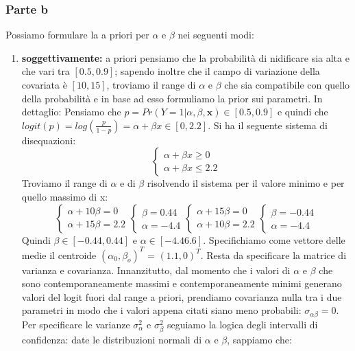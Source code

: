 \subsubsection*{Parte b} %
Possiamo formulare la a priori per $\alpha$ e $\beta$ nei seguenti modi:
\begin{enumerate}
  \item \textbf{soggettivamente:} a priori pensiamo che la probabilità di nidificare sia alta e che vari tra $[0.5, 0.9]$; sapendo inoltre che il campo di variazione della covariata è $[10, 15]$, troviamo il range di $\alpha$ e $\beta$ che sia compatibile con quello della probabilità e in base ad esso formuliamo la prior sui parametri. In dettaglio: Pensiamo che $p=Pr(Y=1 | \alpha, \beta, \mathbf{x}) \in [0.5, 0.9]$ e quindi che $logit(p) = log\left(\frac{p}{1-p}\right) = \alpha + \beta x \in [0, 2.2]$. Si ha il seguente sistema di disequazioni:
  $$\begin{cases} \alpha+\beta x \geq 0 \\ \alpha + \beta x \leq 2.2 \end{cases}$$
  Troviamo il range di $\alpha$ e di $\beta$ risolvendo il sistema per il valore minimo e per quello massimo di x:
  $$\begin{cases} \alpha+10\beta = 0 \\ \alpha +  15\beta = 2.2 \end{cases} \begin{cases}\beta = 0.44 \\ \alpha = -4.4\end{cases} \begin{cases} \alpha+15\beta = 0 \\ \alpha +  10\beta = 2.2 \end{cases} \begin{cases}\beta = -0.44 \\ \alpha = -4.4\end{cases}$$
  Quindi $\beta \in [-0.44, 0.44]$ e $\alpha \in [-4.4 6.6]$.
  Specifichiamo come vettore delle medie il centroide $(\alpha_0, \beta_o)^T$ = $(1.1, 0)^T$.
  Resta da specificare la matrice di varianza e covarianza. Innanzitutto, dal momento che i valori di $\alpha$ e $\beta$ che sono contemporaneamente massimi e contemporanea\-mente minimi generano valori del logit fuori dal range a priori, prendiamo covarianza nulla tra i due parametri in modo che i valori appena citati siano meno probabili: $\sigma_{\alpha\beta} = 0$. Per specificare le varianze $\sigma_{\alpha}^2$ e $\sigma_{\beta}^2$ seguiamo la logica degli intervalli di confidenza: date le distribuzioni normali di $\alpha$ e $\beta$, sappiamo che:

\end{enumerate}
